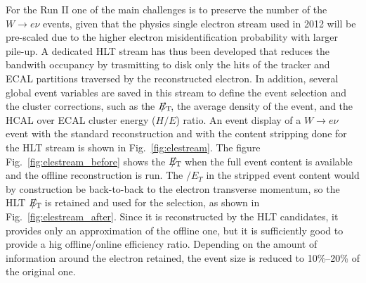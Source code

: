 \documentclass[journal]{IEEEtran}
\newcommand{\ETslash}{\ensuremath{E_{\mathrm{T}}\hspace{-1.1em}/\kern0.45em}}
\begin{document}
For the Run II one of the main challenges is to preserve the number of the $W\to e\nu$ events, given that the physics single electron stream used in 2012 will be pre-scaled due to the higher electron misidentification probability with larger pile-up. A dedicated HLT stream has thus been developed that reduces the bandwith occupancy by trasmitting to disk only the hits of the tracker and ECAL partitions traversed by the reconstructed electron. In addition, several global event variables are saved in this stream to define the event selection and the cluster corrections, such as the $\ETslash$, the average density of the event, and the HCAL over ECAL cluster energy ($H/E$) ratio.  An event display of a $W\to e\nu$ event with the standard reconstruction and with the content stripping done for the HLT stream is shown in Fig.~\ref{fig:elestream}. The figure Fig.~\ref{fig:elestream_before} shows the $\ETslash$ when the full event content is available and the offline reconstruction is run. The $\slash E_T$ in the stripped event content would by construction be back-to-back to the electron transverse momentum, so the HLT $\ETslash$ is retained and used for the selection, as shown in Fig.~\ref{fig:elestream_after}. Since it is reconstructed by the HLT candidates, it provides only an approximation of the offline one, but it is sufficiently good to provide a hig offline/online efficiency ratio. Depending on the amount of information around the electron retained, the event size is reduced to 10\%--20\% of the original one.
%
\end{document}
